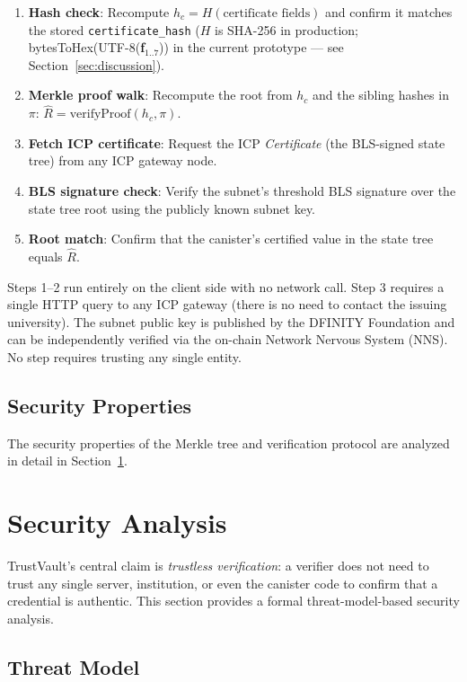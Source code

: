 \documentclass[journal]{IEEEtran}
\begin{document}
\begin{enumerate}
  \item \textbf{Hash check}: Recompute $h_c = H(\text{certificate fields})$ and confirm it matches the stored \texttt{certificate\_hash} ($H$ is SHA-256 in production; bytesToHex(UTF-8(\textbf{f}$_{1..7}$)) in the current prototype — see Section~\ref{sec:discussion}).
  \item \textbf{Merkle proof walk}: Recompute the root from $h_c$ and the sibling hashes in $\pi$: $\hat{R} = \text{verifyProof}(h_c, \pi)$.
  \item \textbf{Fetch ICP certificate}: Request the ICP \emph{Certificate} (the BLS-signed state tree) from any ICP gateway node.
  \item \textbf{BLS signature check}: Verify the subnet's threshold BLS signature over the state tree root using the publicly known subnet key.
  \item \textbf{Root match}: Confirm that the canister's certified value in the state tree equals $\hat{R}$.
\end{enumerate}

Steps 1--2 run entirely on the client side with no network call. Step 3 requires a single HTTP query to any ICP gateway (there is no need to contact the issuing university). The subnet public key is published by the DFINITY Foundation and can be independently verified via the on-chain Network Nervous System (NNS). No step requires trusting any single entity.

\subsection{Security Properties}
\label{subsec:secprop}

The security properties of the Merkle tree and verification protocol are analyzed in detail in Section~\ref{sec:security}.

\section{Security Analysis}
\label{sec:security}

TrustVault's central claim is \emph{trustless verification}: a verifier does not need to trust any single server, institution, or even the canister code to confirm that a credential is authentic. This section provides a formal threat-model-based security analysis.

\subsection{Threat Model}
\end{document}
